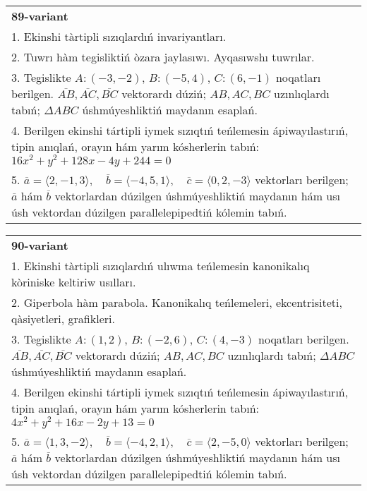\documentclass{article}
\begin{document}
\begin{tabular}{m{17cm}}
\textbf{89-variant}\\
1. Ekinshi tàrtipli sızıqlardıń invariyantları.\\

2. Tuwrı hàm tegisliktiń òzara jaylasıwı. Ayqasıwshı tuwrılar.\\

3. Tegislikte $A: (-3, -2)$, $B: (-5, 4)$, $C: (6, -1)$ noqatları berilgen. $\overline{AB}, \overline{AC}, \overline{BC}$ vektorardı dúziń; $AB, AC, BC$ uzınlıqlardı tabıń; $\Delta ABC$ úshmúyeshliktiń maydanın esaplań. \\

4. Berilgen ekinshi tártipli iymek sızıqtıń teńlemesin ápiwayılastırıń, tipin anıqlań, orayın hám yarım kósherlerin tabıń: $16x^2+y^2+128x-4y+244=0$\\

5. \(\overline{a} = \langle 2, -1, 3 \rangle, \quad \overline{b} = \langle -4, 5, 1 \rangle, \quad \overline{c} = \langle 0, 2, -3 \rangle\) vektorları berilgen; \(\overline{a}\) hám \(\overline{b}\) vektorlardan dúzilgen úshmúyeshliktiń maydanın hám usı úsh vektordan dúzilgen parallelepipedtiń kólemin tabıń.
\end{tabular}
\vspace{1cm}


\begin{tabular}{m{17cm}}
\textbf{90-variant}\\
1. Ekinshi tàrtipli sızıqlardıń ulıwma teńlemesin kanonikalıq kòriniske keltiriw usılları.\\

2. Giperbola hàm parabola. Kanonikalıq teńlemeleri, ekcentrisiteti, qàsiyetleri, grafikleri.\\

3. Tegislikte $A: (1, 2)$, $B: (-2, 6)$, $C: (4, -3)$ noqatları berilgen. $\overline{AB}, \overline{AC}, \overline{BC}$ vektorardı dúziń; $AB, AC, BC$ uzınlıqlardı tabıń; $\Delta ABC$ úshmúyeshliktiń maydanın esaplań. \\

4. Berilgen ekinshi tártipli iymek sızıqtıń teńlemesin ápiwayılastırıń, tipin anıqlań, orayın hám yarım kósherlerin tabıń: $4x^2+y^2+16x-2y+13=0$\\

5. \(\overline{a} = \langle 1, 3, -2 \rangle, \quad \overline{b} = \langle -4, 2, 1 \rangle, \quad \overline{c} = \langle 2, -5, 0 \rangle\) vektorları berilgen; \(\overline{a}\) hám \(\overline{b}\) vektorlardan dúzilgen úshmúyeshliktiń maydanın hám usı úsh vektordan dúzilgen parallelepipedtiń kólemin tabıń.
\end{tabular}
\vspace{1cm}
\end{document}
